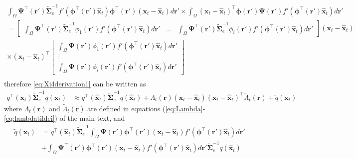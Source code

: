 \documentclass[]{article}
\begin{document}
\begin{align}
 \int_\Omega \boldsymbol{\Psi}^\top(\mathbf{r}') \tilde{\boldsymbol\Sigma}_e^{-1}f'(\boldsymbol \phi^\top(\mathbf r')\mathbf {\hat x}_t) \boldsymbol \phi^\top(\mathbf r')(\mathbf x_t - \mathbf  {\hat x}_t)d\mathbf{r}' \times\int_\Omega  (\mathbf x_t - \mathbf  {\hat x}_t)^\top\boldsymbol \phi(\mathbf r') \boldsymbol{\Psi}(\mathbf{r}')f'(\boldsymbol \phi^\top(\mathbf r')\mathbf {\hat x}_t) d\mathbf{r}'& \nonumber \\
=\begin{bmatrix} \int_{\Omega} \boldsymbol \Psi^\top(\mathbf r')\tilde{\boldsymbol \Sigma}_e^{-1}\phi_1(\mathbf r')f'(\boldsymbol\phi^\top(\mathbf r')\mathbf {\hat x}_t)d\mathbf r' &  \dots & \int_{\Omega} \boldsymbol \Psi^\top(\mathbf r')\tilde{\boldsymbol \Sigma}_e^{-1}\phi_i(\mathbf r')f'(\boldsymbol\phi^\top(\mathbf r')\mathbf {\hat x}_t)d\mathbf r'\end{bmatrix}(\mathbf x_t - \mathbf  {\hat x}_t) & \nonumber \\
\times (\mathbf x_t - \mathbf  {\hat x}_t)^\top \begin{bmatrix}\int_{\Omega} \boldsymbol \Psi(\mathbf r')\phi_1(\mathbf r')f'(\boldsymbol\phi^\top(\mathbf r')\mathbf {\hat x}_t)d\mathbf r' \\  \vdots \\ \int_{\Omega} \boldsymbol \Psi(\mathbf r')\phi_i(\mathbf r')f'(\boldsymbol\phi^\top(\mathbf r')\mathbf {\hat x}_t)d\mathbf r'\end{bmatrix}& \nonumber \\
\end{align}
therefore \ref{eq:Xi4derivation1} can be written as
\begin{align}\label{eq:Xi3derivation2}
  q^\top(\mathbf x_t)\tilde{\boldsymbol\Sigma}_e^{-1}q(\mathbf x_t)&\approx q^\top(\mathbf {\hat x}_t)\tilde{\boldsymbol\Sigma}_e^{-1}q(\mathbf {\hat x}_t)+\Lambda_t(\mathbf r)(\mathbf x_t - \mathbf  {\hat x}_t) (\mathbf x_t - \mathbf  {\hat x}_t)^\top\tilde{\Lambda}_t(\mathbf r)+\tilde{q}(\mathbf x_t)
\end{align}
where $\Lambda_t(\mathbf r)$ and $\tilde{\Lambda}_t(\mathbf r)$ are defined in equations (\ref{eq:Lambda}-\ref{eq:lambdatildei}) of the main text, and  
\begin{align}\label{eq:qtilde}
 \tilde{q}(\mathbf x_t)&=q^\top(\mathbf {\hat x}_t)\tilde{\boldsymbol\Sigma}_e^{-1}\int_\Omega \boldsymbol{\Psi}(\mathbf{r}')\boldsymbol \phi^\top(\mathbf r') (\mathbf x_t - \mathbf  {\hat x}_t)f'(\boldsymbol \phi^\top(\mathbf r')\mathbf {\hat x}_t) d\mathbf{r}'\nonumber\\
&+\int_\Omega \boldsymbol{\Psi}^\top(\mathbf{r}')\boldsymbol \phi^\top(\mathbf r') (\mathbf x_t - \mathbf  {\hat x}_t)f'(\boldsymbol \phi^\top(\mathbf r')\mathbf {\hat x}_t) d\mathbf{r}'\tilde{\boldsymbol\Sigma}_e^{-1}q(\mathbf {\hat x}_t)
\end{align}
\end{document}
